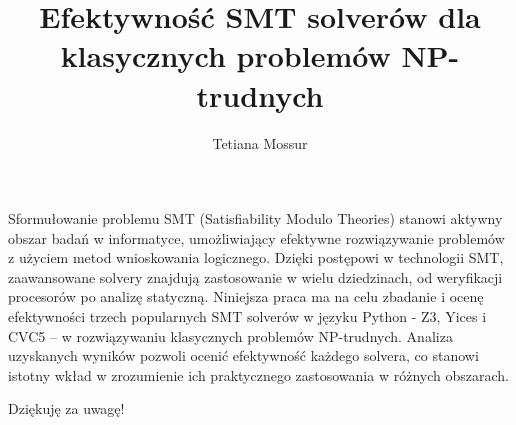 \documentclass{beamer}
\title{Efektywność SMT solverów dla klasycznych problemów NP-trudnych}
\author{Tetiana Mossur}
\institute[UJD]
{
	Uniwersytet Jana Długosza w Częstochowie \\
	\medskip
}
\date{}
\begin{document}
	
	\begin{frame}
		\titlepage
	\end{frame}


	\begin{frame}{Sformułowanie problemu}
		SMT (Satisfiability Modulo Theories) stanowi aktywny obszar badań w informatyce, umożliwiający efektywne rozwiązywanie problemów z użyciem metod wnioskowania logicznego. Dzięki postępowi  w technologii SMT, zaawansowane solvery znajdują zastosowanie  w wielu dziedzinach, od weryfikacji procesorów po analizę statyczną. 
		Niniejsza praca ma na celu zbadanie i ocenę efektywności trzech popularnych SMT solverów w języku Python - Z3, Yices i CVC5 –  w rozwiązywaniu klasycznych problemów NP-trudnych. Analiza uzyskanych wyników pozwoli ocenić efektywność każdego solvera,  co stanowi istotny wkład w zrozumienie ich praktycznego zastosowania  w różnych obszarach.
	\end{frame}
	
	
	\begin{frame}
		\Huge{\centerline{Dziękuję za uwagę!}}
	\end{frame}
	
	

	
\end{document}
